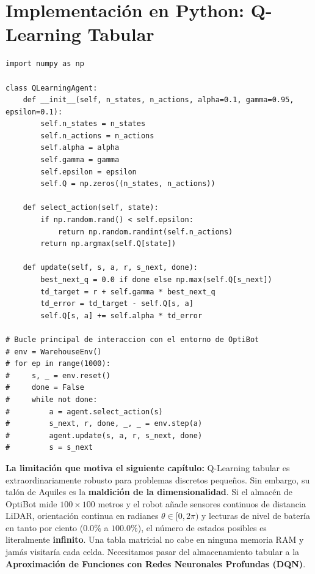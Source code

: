 \section{Implementación en Python: Q-Learning Tabular}
\begin{lstlisting}[style=rlcode]
import numpy as np

class QLearningAgent:
    def __init__(self, n_states, n_actions, alpha=0.1, gamma=0.95, epsilon=0.1):
        self.n_states = n_states
        self.n_actions = n_actions
        self.alpha = alpha
        self.gamma = gamma
        self.epsilon = epsilon
        self.Q = np.zeros((n_states, n_actions))

    def select_action(self, state):
        if np.random.rand() < self.epsilon:
            return np.random.randint(self.n_actions)
        return np.argmax(self.Q[state])

    def update(self, s, a, r, s_next, done):
        best_next_q = 0.0 if done else np.max(self.Q[s_next])
        td_target = r + self.gamma * best_next_q
        td_error = td_target - self.Q[s, a]
        self.Q[s, a] += self.alpha * td_error

# Bucle principal de interaccion con el entorno de OptiBot
# env = WarehouseEnv()
# for ep in range(1000):
#     s, _ = env.reset()
#     done = False
#     while not done:
#         a = agent.select_action(s)
#         s_next, r, done, _, _ = env.step(a)
#         agent.update(s, a, r, s_next, done)
#         s = s_next
\end{lstlisting}

\begin{notabox}
\textbf{La limitación que motiva el siguiente capítulo:} Q-Learning tabular es extraordinariamente robusto para problemas discretos pequeños. Sin embargo, su talón de Aquiles es la \textbf{maldición de la dimensionalidad}. Si el almacén de OptiBot mide $100 \times 100$ metros y el robot añade sensores continuos de distancia LiDAR, orientación continua en radianes $\theta \in [0, 2\pi)$ y lecturas de nivel de batería en tanto por ciento ($0.0\%$ a $100.0\%$), el número de estados posibles es literalmente \textbf{infinito}. Una tabla matricial no cabe en ninguna memoria RAM y jamás visitaría cada celda. Necesitamos pasar del almacenamiento tabular a la \textbf{Aproximación de Funciones con Redes Neuronales Profundas (DQN)}.
\end{notabox}
